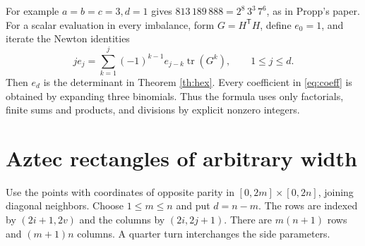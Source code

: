 \documentclass[11pt,letterpaper]{article}
\newcommand{\tr}{\operatorname{tr}}
\begin{document}
For example \(a=b=c=3,d=1\) gives \(813\,189\,888=2^8\,3^3\,7^6\), as in Propp's paper. For a scalar evaluation in every imbalance, form \(G=H^{\mathsf T}H\), define \(e_0=1\), and iterate the Newton identities
\[
 j e_j=\sum_{k=1}^j(-1)^{k-1} e_{j-k}\tr(G^k),\qquad 1\le j\le d.
\]
Then \(e_d\) is the determinant in Theorem \ref{th:hex}. Every coefficient in \eqref{eq:coeff} is obtained by expanding three binomials. Thus the formula uses only factorials, finite sums and products, and divisions by explicit nonzero integers.

\clearpage
\section{Aztec rectangles of arbitrary width}
Use the points with coordinates of opposite parity in
\([0,2m]\times[0,2n]\), joining diagonal neighbors. Choose \(1\le m\le n\) and put \(d=n-m\). The rows are indexed by \((2i+1,2v)\) and the columns by \((2i,2j+1)\). There are \(m(n+1)\) rows and \((m+1)n\) columns. A quarter turn interchanges the side parameters.
\end{document}
